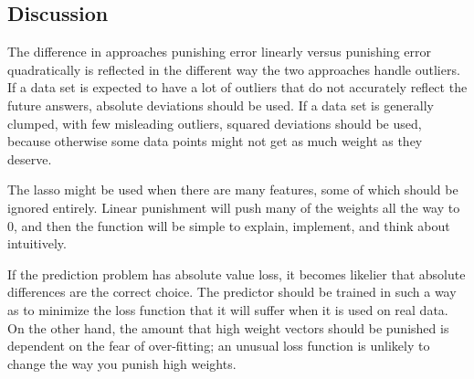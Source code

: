 \documentclass{sigchi}
\begin{document}
\subsection{Discussion}

The difference in approaches punishing error linearly versus punishing error quadratically is reflected in the different way the two approaches handle outliers. If a data set is expected to have a lot of outliers that do not accurately reflect the future answers, absolute deviations should be used. If a data set is generally clumped, with few misleading outliers, squared deviations should be used, because otherwise some data points might not get as much weight as they deserve. 

The lasso  might be used when there are many features, some of which should be ignored entirely. Linear punishment will push many of the weights all the way to 0, and then the function will be simple to explain, implement, and think about intuitively.

If the prediction problem has absolute value loss, it becomes likelier that absolute differences are the correct choice. The predictor should be trained in such a way as to minimize the loss function that it will suffer when it is used on real data. On the other hand, the amount that high weight vectors should be punished is dependent on the fear of over-fitting; an unusual loss function is unlikely to change the way you punish high weights.
\end{document}
